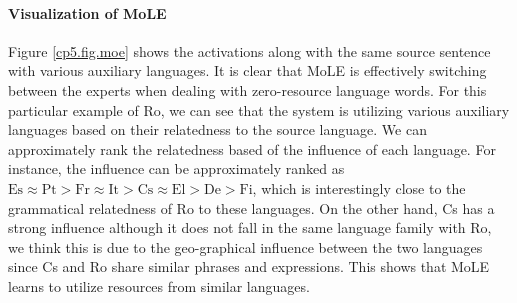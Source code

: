 \paragraph{Visualization of MoLE}
Figure \ref{cp5.fig.moe} shows the activations along with the same source sentence with various auxiliary languages. It is clear that MoLE is effectively switching between the  experts when dealing with  zero-resource language words. 
For this particular example of Ro, we can see that the system is utilizing  various auxiliary languages based on their relatedness to the source language. We can approximately rank the relatedness based of the influence of each language. For instance, the influence can be approximately ranked as $\text{Es} \approx \text{Pt} > \text{Fr} \approx \text{It} > \text{Cs} \approx \text{El} > \text{De} > \text{Fi}$, which is interestingly close to the  grammatical relatedness of Ro to these languages. On the other hand, Cs has a strong influence although it does not fall in the same language family with Ro, we think this is due to the geo-graphical influence between the two languages  since  Cs and Ro share similar phrases and expressions. This shows that MoLE learns to utilize resources from similar languages.



